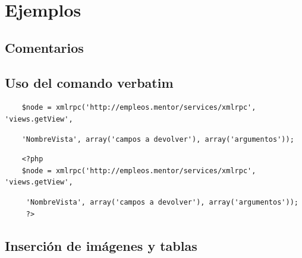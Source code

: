 \chapter*{\large Ejemplos}

\pagestyle{fancy}
\lhead{}
\chead{}
\lfoot{}
\cfoot{}
\rfoot{\thepage}
\renewcommand{\headrulewidth}{0.4pt}
 \vspace{-1cm}



\section*{\large Comentarios}


\section*{\large Uso del comando verbatim}

\begin{verbatim}
    $node = xmlrpc('http://empleos.mentor/services/xmlrpc', 'views.getView',            
\end{verbatim}

\begin{verbatim}
    'NombreVista', array('campos a devolver'), array('argumentos'));
\end{verbatim}


\begin{verbatim}
    <?php
    $node = xmlrpc('http://empleos.mentor/services/xmlrpc', 'views.getView',            
\end{verbatim}

\begin{verbatim}
     'NombreVista', array('campos a devolver'), array('argumentos'));
     ?>
\end{verbatim}


\section*{\large Inserción de imágenes y tablas}

